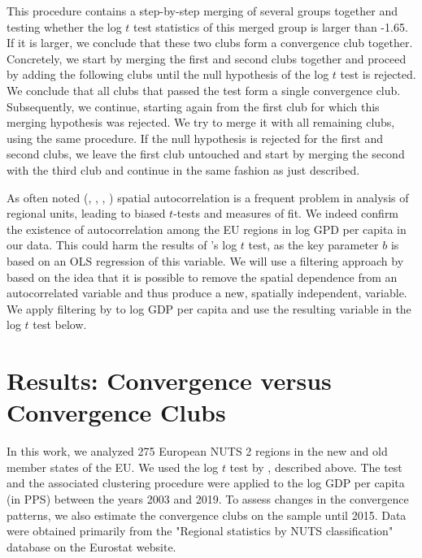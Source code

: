 \documentclass[11pt]{article}
\begin{document}
This procedure contains a step-by-step merging of several groups together and testing whether the log $t$ test statistics of this merged group is larger than -1.65. If it is larger, we conclude that these two clubs form a convergence club together. Concretely, we start by merging the first and second clubs together and proceed by adding the following clubs until the null hypothesis of the log $t$ test is rejected. We conclude that all clubs that passed the test form a single convergence club. Subsequently, we continue, starting again from the first club for which this merging hypothesis was rejected. We try to merge it with all remaining clubs, using the same procedure. If the null hypothesis is rejected for the first and second clubs, we leave the first club untouched and start by merging the second with the third club and continue in the same fashion as just described.

As often noted (\citet{dall2008regional}, \citet{magrini2004regional}, \citet{anselin1991properties}, \citet{anselin2001spatial}) spatial autocorrelation is a frequent problem in analysis of regional units, leading to biased $t$-tests and measures of fit. We indeed confirm the existence of autocorrelation among the EU regions in log GPD per capita in our data. This could harm the results of \citeauthor{phillips2007transition}'s log $t$ test, as the key parameter $b$ is based on an OLS regression of this variable. We will use a filtering approach by \cite{getis2002comparative} based on the idea that it is possible to remove the spatial dependence from an autocorrelated variable and thus produce a new, spatially independent, variable. We apply filtering by \cite{getis2002comparative} to log GDP per capita and use the resulting variable in the log $t$ test below.



\section{Results: Convergence versus Convergence Clubs}
In this work, we analyzed 275 European NUTS 2 regions in the new and old member states of the EU. We used the log $t$ test by \citet{phillips2009economic}, described above. The test and the associated clustering procedure were applied to the log GDP per capita (in PPS) between the years 2003 and 2019. To assess changes in the convergence patterns, we also estimate the convergence clubs on the sample until 2015. Data were obtained primarily from the "Regional statistics by NUTS classification" database on the Eurostat website.
\end{document}
